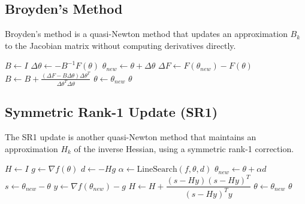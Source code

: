 \subsection{Broyden's Method}

  \begin{algo}
    Broyden’s method is a quasi-Newton method that updates an approximation $B_k$ to the Jacobian matrix without computing derivatives directly. 
    \begin{algorithm}[H]
    \label{alg:broyden}
    \begin{algorithmic}[1]

        \State $B \gets I$ 
          \State $\Delta \theta \gets -B^{-1} F(\theta)$
          \State $\theta_{new} \gets \theta + \Delta \theta$
          \State $\Delta F \gets F(\theta_{new}) - F(\theta)$
          \State $B \gets B + \frac{(\Delta F - B \Delta \theta)\Delta \theta^T}{\Delta \theta^T \Delta \theta}$
          \State $\theta \gets \theta_{new}$
        \EndWhile
        \State \Return $\theta$
      \EndProcedure
    \end{algorithmic}
    \end{algorithm}
  \end{algo}

\subsection{Symmetric Rank-1 Update (SR1)}

  \begin{algo}
    The SR1 update is another quasi-Newton method that maintains an approximation $H_k$ of the inverse Hessian, using a symmetric rank-1 correction. 
    \begin{algorithm}[H]
    \label{alg:sr1}
    \begin{algorithmic}[1]

        \State $H \gets I$
          \State $g \gets \nabla f(\theta)$
          \State $d \gets -H g$
          \State $\alpha \gets \text{LineSearch}(f, \theta, d)$
          \State $\theta_{new} \gets \theta + \alpha d$
          \State $s \gets \theta_{new} - \theta$
          \State $y \gets \nabla f(\theta_{new}) - g$
            \State $H \gets H + \dfrac{(s - Hy)(s - Hy)^T}{(s - Hy)^T y}$
          \EndIf
          \State $\theta \gets \theta_{new}$
        \EndWhile
        \State \Return $\theta$
      \EndProcedure
    \end{algorithmic}
    \end{algorithm}
  \end{algo}

